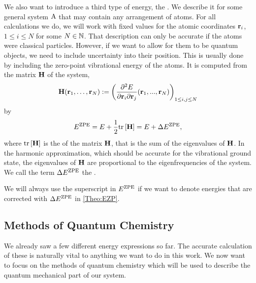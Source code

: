 \documentclass[8.5pt,twoside,twocolumn]{article}
\newcommand\ezp{\enmat{E^{\te{ZPE}}}}
\renewcommand\H{\enmat{\bo H}}
\renewcommand\r{\bo r}
\theoremstyle{standard}
\begin{document}
We also want to introduce a third type of energy, the .
We describe it for some general system $\text A$ that may contain any arrangement of atoms.
For all calculations we do, we will work with fixed values for the atomic coordinates
$\r_i$, $1 \le i \le N$ for some $N \in \mathbb{N}$. That description can only be accurate if
the atoms were classical particles. However, if we want to allow for them to be
quantum objects, we need to include uncertainty into their position. This is usually
done by including the zero-point vibrational energy of the atoms. It is computed from the
 matrix $\H$ of the system,
\begin{equation}
 \H(\r_1,\ldots,\r_N) := \rb{\deri {^2 E} {\r_i \del \r_j} (\r_1,...,\r_N) }_{1\le i,j \le N}
 \label{Theo:Hessian}
\end{equation}
by
\begin{equation}
 \ezp=E + \frac 1 2 \te {tr} \ed{\H} = E + \Dl \ezp,
 \label{Theo:EZP}
\end{equation}
where $\te {tr} \ed{\H}$ is the  of the matrix $\H$, that is the sum of the eigenvalues
of $\H$. In the harmonic approximation, which should be accurate for the vibrational ground 
state, the eigenvalues of $\H$ are 
proportional
to the eigenfrequencies of the system. We call the term $\Dl \ezp$ the .

We will always use the superscript in $\ezp$ if we want to denote energies that are corrected 
with $\Dl \ezp$ in \eqref{Theo:EZP}.

\subsection{Methods of Quantum Chemistry}
\label{Sec:Theo:QMMet}

We already saw a few different energy expressions so far. The accurate calculation of these 
is naturally vital to anything we want to do in this work. We now want to focus on the methods
of quantum chemistry which will be used to describe the quantum mechanical part of our system.
\end{document}

